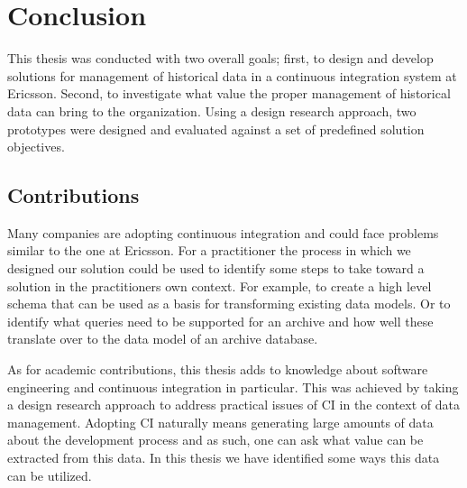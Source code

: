 \chapter{Conclusion}
\label{chap:conclusion}
This thesis was conducted with two overall goals; first, to design and develop solutions for management of historical data in a continuous integration system at Ericsson. Second, to investigate what value the proper management of historical data can bring to the organization. Using a design research approach, two prototypes were designed and evaluated against a set of predefined solution objectives.



%
%


\section{Contributions}


Many companies are adopting continuous integration and could face problems similar to the one at Ericsson. For a practitioner the process in which we designed our solution could be used to identify some steps to take toward a solution in the practitioners own context. For example, to create a high level schema that can be used as a basis for transforming existing data models. Or to identify what queries need to be supported for an archive and how well these translate over to the data model of an archive database.

As for academic contributions, this thesis adds to knowledge about software engineering and continuous integration in particular. This was achieved by taking a design research approach to address practical issues of CI in the context of data management. Adopting CI naturally means generating large amounts of data about the development process and as such, one can ask what value can be extracted from this data. In this thesis we have identified some ways this data can be utilized. 

